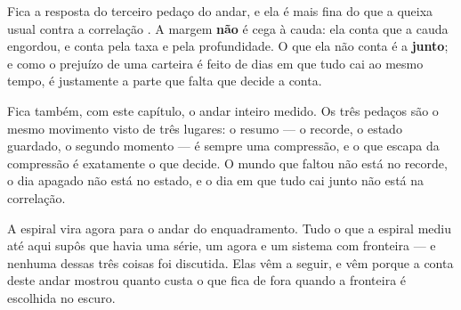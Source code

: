 Fica a resposta do terceiro pedaço do andar, e ela é mais fina do que a queixa usual contra a
correlação \cite{koike2026measuring}. A margem \textbf{não} é cega à cauda: ela conta que a cauda engordou, e conta pela taxa e pela
profundidade. O que ela não conta é a \textbf{junto}; e como o prejuízo de uma carteira é feito de dias em
que tudo cai ao mesmo tempo, é justamente a parte que falta que decide a conta.

Fica também, com este capítulo, o andar inteiro medido. Os três pedaços são o mesmo movimento visto
de três lugares: o resumo --- o recorde, o estado guardado, o segundo momento --- é sempre uma
compressão, e o que escapa da compressão é exatamente o que decide. O mundo que faltou não está no
recorde, o dia apagado não está no estado, e o dia em que tudo cai junto não está na correlação.

A espiral vira agora para o andar do enquadramento. Tudo o que a espiral mediu até aqui supôs que
havia uma série, um agora e um sistema com fronteira --- e nenhuma dessas três coisas foi discutida.
Elas vêm a seguir, e vêm porque a conta deste andar mostrou quanto custa o que fica de fora quando a
fronteira é escolhida no escuro.

